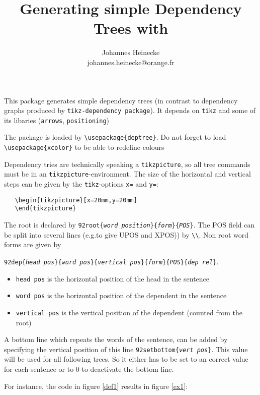 \documentclass[12pt]{article}
\title{Generating simple Dependency Trees with \XeLaTeX}
\author{Johannes Heinecke\\johannes.heinecke@orange.fr}
\begin{document}
\maketitle


This package generates simple dependency trees (in contrast to
dependency graphs produced by {\tt tikz-dependency package}).
It depends on {\tt tikz} and some of its libaries ({\tt arrows}, {\tt positioning})

The package is loaded by \verb:\usepackage{deptree}:. Do not forget to
load \verb:\usepackage{xcolor}: to be able to redefine colours


Dependency tries are technically speaking a \verb:tikzpicture:, so
all tree commands must be in an \verb:tikzpicture:-environment. The
size of the horizontal and vertical steps can be given by the
\verb:tikz:-options \verb:x=: and \verb:y=::


\begin{verbatim}
   \begin{tikzpicture}[x=20mm,y=20mm]
   \end{tikzpicture}
\end{verbatim}

The root is declared by {\tt\char92root\{\emph{word position}\}\{\emph{form}\}\{\emph{POS}\}}. 
The POS field can be split into several lines (e.g.to give UPOS and
XPOS)) by {\verb:\\:}.
Non root word forms are given by 

{\tt\char92dep\{\emph{head pos}\}\{\emph{word pos}\}\{\emph{vertical pos}\}\{\emph{form}\}\{\emph{POS}\}\{\emph{dep rel}\}}.

\begin{itemize}
\item \verb:head pos: is the horizontal position of the head in the sentence
\item \verb:word pos: is the horizontal position of the dependent in the sentence
\item \verb:vertical pos: is the vertical position of the dependent
  (counted from the root)
\end{itemize}

A bottom line which repeats the words of the sentence, can be added by
specifying the vertical position of this line
{\tt\char92setbottom\{\emph{vert pos}\}}. This value will be used for
all following trees. So it either has to be set to an correct value
for each sentence or to 0 to deactivate the bottom line.

For instance, the code in figure \ref{def1} results in figure \ref{ex1}:
\end{document}
